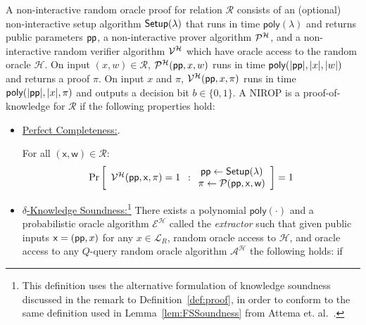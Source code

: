 \begin{definition}
	A non-interactive random oracle proof for relation $\mathcal{R}$ consists of an (optional) non-interactive setup algorithm $\textsf{{Setup}}(\lambda)$ that runs in time $\textsf{poly}(\lambda)$ and returns public parameters $\textsf{pp}$, a non-interactive prover algorithm $\mathcal{P}^\mathcal{H}$, and a non-interactive random verifier algorithm $\mathcal{V}^\mathcal{H}$ which have oracle access to the random oracle $\mathcal{H}$. On input $(x,w) \in \mathcal{R}$, $\mathcal{P}^\mathcal{H}(\textsf{pp}, x, w)$ runs in time $\textsf{poly}(|\textsf{pp}|, |x|, |w|)$ and returns a proof $\pi$. On input $x$ and $\pi$, $\mathcal{V}^\mathcal{H}(\textsf{pp}, x, \pi)$ runs in time $\textsf{poly}(|\textsf{pp}|, |x|, \pi)$ and outputs a decision bit $b \in \{0,1\}$. A NIROP is a proof-of-knowledge for $\mathcal{R}$ if the following properties hold: 

\begin{itemize}
\item \underline{Perfect Completeness:}. 
\begin{small}
For all $(\mathsf{x}, \mathsf{w}) \in \mathcal{R}$: \[
\Pr \left[
\begin{array}{c}
         \mathcal{V}^\mathcal{H}(\textsf{pp}, \mathsf{x}, \pi) = 1 \\
\end{array}
:
\begin{array}{c}
             \textsf{pp} \leftarrow \textsf{{Setup}}(\lambda) \\
             \pi \leftarrow \mathcal{P}(\textsf{pp}, \mathsf{x}, \mathsf{w}) \\
\end{array} 
\right]  = 1 
 \]
 \end{small}

\item \underline{$\delta$-Knowledge Soundness:}\footnote{This definition uses the alternative formulation of knowledge soundness discussed in the remark to Definition~\ref{def:proof}, in order to conform to the same definition used in Lemma~\ref{lem:FSSoundness} from Attema et. al.~\cite{AFK21}.}
There exists a polynomial $\textsf{poly}(\cdot)$ and a probabilistic oracle algorithm $\mathcal{E}^\mathcal{H}$ called the \emph{extractor} such that given public inputs $\mathsf{x} = (\textsf{pp}, x)$ for any $x \in \mathcal{L}_R$, random oracle access to $\mathcal{H}$, and oracle access to any $Q$-query random oracle algorithm $\mathcal{A}^{\mathcal{H}}$ the following holds: if 


\end{itemize}
\end{definition}
